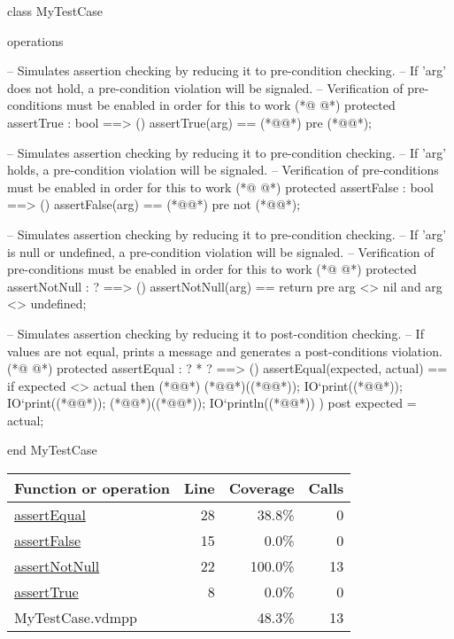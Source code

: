 \begin{vdmpp}[breaklines=true]
class MyTestCase

operations

  -- Simulates assertion checking by reducing it to pre-condition checking.
  -- If 'arg' does not hold, a pre-condition violation will be signaled.
  -- Verification of pre-conditions must be enabled in order for this to work
(*@
\label{assertTrue:8}
@*)
  protected assertTrue : bool ==> ()
  assertTrue(arg) == (*@@*)
  pre (*@@*);

  -- Simulates assertion checking by reducing it to pre-condition checking.
  -- If 'arg' holds, a pre-condition violation will be signaled.
  -- Verification of pre-conditions must be enabled in order for this to work
(*@
\label{assertFalse:15}
@*)
  protected assertFalse : bool ==> ()
  assertFalse(arg) == (*@@*)
  pre not (*@@*);

  -- Simulates assertion checking by reducing it to pre-condition checking.
  -- If 'arg' is null or undefined, a pre-condition violation will be signaled.
  -- Verification of pre-conditions must be enabled in order for this to work
(*@
\label{assertNotNull:22}
@*)
  protected assertNotNull : ? ==> ()
  assertNotNull(arg) == return
  pre arg <> nil and arg <> undefined;

  -- Simulates assertion checking by reducing it to post-condition checking.
  -- If values are not equal, prints a message and generates a post-conditions violation.
(*@
\label{assertEqual:28}
@*)
  protected assertEqual : ? * ? ==> ()
  assertEqual(expected, actual) ==
    if expected <> actual then
    (*@\vdmnotcovered{(}@*)
      (*@@*)((*@@*));
      IO`print((*@@*));
      IO`print((*@@*));
      (*@@*)((*@@*));
      IO`println((*@@*))
    )
  post expected = actual;

end MyTestCase
\end{vdmpp}
\bigskip
\begin{longtable}{|l|r|r|r|}
\hline
Function or operation & Line & Coverage & Calls \\
\hline
\hline
\hyperref[assertEqual:28]{assertEqual} & 28&38.8\% & 0 \\
\hline
\hyperref[assertFalse:15]{assertFalse} & 15&0.0\% & 0 \\
\hline
\hyperref[assertNotNull:22]{assertNotNull} & 22&100.0\% & 13 \\
\hline
\hyperref[assertTrue:8]{assertTrue} & 8&0.0\% & 0 \\
\hline
\hline
MyTestCase.vdmpp & & 48.3\% & 13 \\
\hline
\end{longtable}

